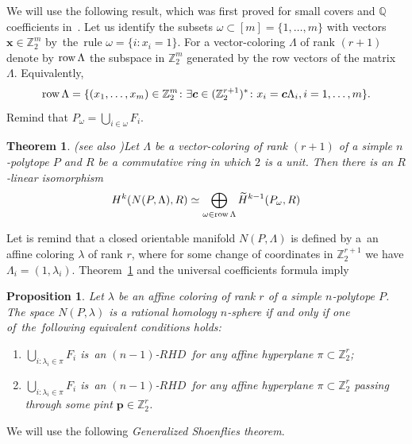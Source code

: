 \documentclass[12pt]{amsart}
\newtheorem{proposition}[formula]{Proposition}
\newtheorem{theorem}[formula]{Theorem}
\theoremstyle{definition}
\theoremstyle{remark}
\begin{document}
We will use the following result,
which was first proved for small covers and $\mathbb Q$ coefficients in~\cite{ST12, T12}. Let us identify the subsets
$\omega\subset[m]=\{1,\dots,m\}$ with vectors $\boldsymbol{x}\in\mathbb Z_2^m$ by~the~rule $\omega=\{i\colon x_i=1\}$.
For a vector-coloring $\Lambda$ of rank $(r+1)$ denote by ${\rm row}\,\Lambda$ the subspace in $\mathbb Z_2^m$ 
generated by the row vectors of the matrix $\Lambda$. Equivalently, 
$$
{\rm row}\,\Lambda=\{(x_1,\dots,x_m)\in\mathbb Z_2^m\colon\exists\boldsymbol{c}\in(\mathbb Z_2^{r+1})^*\colon x_i=
\boldsymbol{c}\Lambda_i, i=1,\dots,m\}.
$$
Remind that $P_{\omega}=\bigcup_{i\in\omega}F_i$.
\begin{theorem}\cite[Theorem 4.5]{CP17}{\rm (see also \cite[Theorem 1.1]{CP20})}\label{HNPLth}
Let $\Lambda$ be a vector-coloring of rank $(r+1)$ of a simple $n$-polytope $P$ and $R$ be
a commutative ring in which $2$ is a unit. Then there is an $R$-linear isomorphism
$$
H^k(N(P,\Lambda), R)\simeq\bigoplus_{\omega\in{\rm row}\,\Lambda}\widetilde{H}^{k-1}(P_{\omega}, R)
$$
\end{theorem}
Let is remind that a closed orientable manifold $N(P,\Lambda)$ is defined by a~an affine coloring $\lambda$
of rank $r$, where for some change of coordinates in $\mathbb Z_2^{r+1}$ we have $\Lambda_i=(1,\lambda_i)$. 
Theorem~\ref{HNPLth} and the universal coefficients formula imply
\begin{proposition}\label{pr:rhs}
Let $\lambda$ be an affine coloring of rank $r$ of a simple $n$-polytope $P$.
The space $N(P,\lambda)$ is a rational homology $n$-sphere if and only if 
one of~the~following equivalent conditions holds:
\begin{enumerate}
\item $\bigcup\limits_{i\colon \lambda_i\in \pi }F_i$ is~an $(n-1)$-$RHD$~for any affine hyperplane $\pi\subset\mathbb Z_2^r$;
\item  $\bigcup\limits_{i\colon \lambda_i\in \pi }F_i$ is~an $(n-1)$-$RHD$~for any affine hyperplane $\pi\subset\mathbb Z_2^r$
passing through some  pint $\boldsymbol{p}\in\mathbb Z_2^r$.
\end{enumerate}
\end{proposition}

We will use the following {\it Generalized Shoenflies theorem}.
\end{document}
